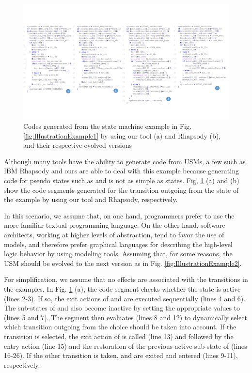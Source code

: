 \begin{figure}
	\centering
	\includegraphics[clip, trim=0cm 2.6cm 0cm 3.4cm, width=\textwidth]{figures/generatedcode.pdf}
	\caption{Codes generated from the state machine example in Fig. \ref{fig:IllustrationExample1} by using our tool (a) and Rhapsody (b), and their respective evolved versions} 
	\label{fig:generatedcode}
\end{figure}

Although many tools have the ability to generate code from USMs, a few such as IBM Rhapsody \cite{ibm_rhapsody} and ours are able to deal with this example because generating code for pseudo states such as  and  is not as simple as states.
Fig, \ref{fig:generatedcode} (a) and (b) show the code segments generated for the transition outgoing from the state  of the example by using our tool and Rhapsody, respectively.

In this scenario, we assume that, on one hand, programmers prefer to
use the more familiar textual programming language. 
On the other hand, software architects, working at higher levels
of abstraction, tend to favor the use of models, and therefore
prefer graphical languages for describing the high-level logic behavior by using modeling tools.
Assuming that, for some reasons, the USM should be evolved to the next version as in Fig. \ref{fig:IllustrationExample2}.


For simplification, we assume that no effects are associated with the transitions in the examples.
In Fig. \ref{fig:generatedcode} (a), the code segment checks whether the state  is active (lines 2-3).
If so, the exit actions of  and  are executed sequentially (lines 4 and 6).
The sub-states of  and  also become inactive by setting the appropriate values to  (lines 5 and 7).
The segment then evaluates  (lines 8 and 12) to dynamically select which transition outgoing from the choice  should be taken into account.
If the transition  is selected, the exit action of  is called (line 13) and followed by the entry action (line 15) and the restoration of the previous active sub-state of  (lines 16-26). 
If the other transition  is taken,  and  are exited and entered (lines 9-11), respectively.

